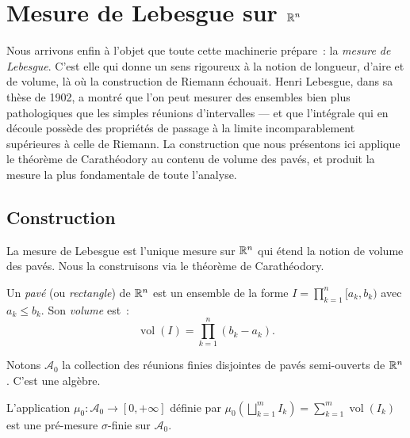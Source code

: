 \chapter{Mesure de Lebesgue sur $\mathbb{R}^n$}
\label{ch:lebesgue}

Nous arrivons enfin \`a l'objet que toute cette machinerie pr\'epare~: la \emph{mesure de Lebesgue}. C'est elle qui donne un sens rigoureux \`a la notion de longueur, d'aire et de volume, l\`a o\`u la construction de Riemann \'echouait. Henri Lebesgue, dans sa th\`ese de 1902, a montr\'e que l'on peut mesurer des ensembles bien plus pathologiques que les simples r\'eunions d'intervalles --- et que l'int\'egrale qui en d\'ecoule poss\`ede des propri\'et\'es de passage \`a la limite incomparablement sup\'erieures \`a celle de Riemann. La construction que nous pr\'esentons ici applique le th\'eor\`eme de Carath\'eodory au contenu de volume des pav\'es, et produit la mesure la plus fondamentale de toute l'analyse.

\section{Construction}

La mesure de Lebesgue est l'unique mesure sur $\mathbb{R}^n$ qui \'etend la notion de volume
des pav\'es. Nous la construisons via le th\'eor\`eme de Carath\'eodory.

\begin{definition}
Un \emph{pav\'e} (ou \emph{rectangle}) de $\mathbb{R}^n$ est un ensemble de la forme
$I = \prod_{k=1}^n [a_k, b_k)$ avec $a_k \leq b_k$. Son \emph{volume} est~:
\[
\operatorname{vol}(I) = \prod_{k=1}^n (b_k - a_k).
\]
\end{definition}

\begin{definition}
Notons $\mathcal{A}_0$ la collection des r\'eunions finies disjointes de pav\'es
semi-ouverts de $\mathbb{R}^n$. C'est une alg\`ebre.
\end{definition}

\begin{proposition}
L'application $\mu_0 : \mathcal{A}_0 \to [0, +\infty]$ d\'efinie par
$\mu_0\!\left(\bigsqcup_{k=1}^m I_k\right) = \sum_{k=1}^m \operatorname{vol}(I_k)$
est une pr\'e-mesure $\sigma$-finie sur $\mathcal{A}_0$.
\end{proposition}

